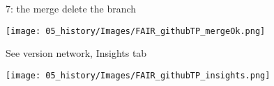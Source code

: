 \begin{frame}{ }
\begin{exampleblock}{7: the merge delete the branch}
    \begin{center}
    \texttt{[image: 05\_history/Images/FAIR\_githubTP\_mergeOk.png]}
    \end{center}
\end{exampleblock}
\end{frame}
\begin{frame}{ }
\begin{exampleblock}{See version network, Insights tab}
    \begin{center}
    \texttt{[image: 05\_history/Images/FAIR\_githubTP\_insights.png]}
    \end{center}
\end{exampleblock}
\end{frame}